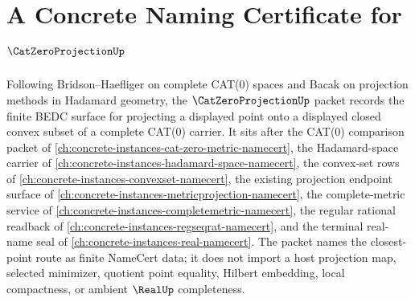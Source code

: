 \chapter{A Concrete Naming Certificate for $\CatZeroProjectionUp$}
\label{ch:concrete-instances-cat-zero-projection-namecert}

Following Bridson--Haefliger on complete CAT(0) spaces and Bacak on projection methods in Hadamard geometry, the $\CatZeroProjectionUp$ packet records the finite BEDC surface for projecting a displayed point onto a displayed closed convex subset of a complete CAT(0) carrier. It sits after the CAT(0) comparison packet of \autoref{ch:concrete-instances-cat-zero-metric-namecert}, the Hadamard-space carrier of \autoref{ch:concrete-instances-hadamard-space-namecert}, the convex-set rows of \autoref{ch:concrete-instances-convexset-namecert}, the existing projection endpoint surface of \autoref{ch:concrete-instances-metricprojection-namecert}, the complete-metric service of \autoref{ch:concrete-instances-completemetric-namecert}, the regular rational readback of \autoref{ch:concrete-instances-regseqrat-namecert}, and the terminal real-name seal of \autoref{ch:concrete-instances-real-namecert}. The packet names the closest-point route as finite NameCert data; it does not import a host projection map, selected minimizer, quotient point equality, Hilbert embedding, local compactness, or ambient $\RealUp$ completeness.

